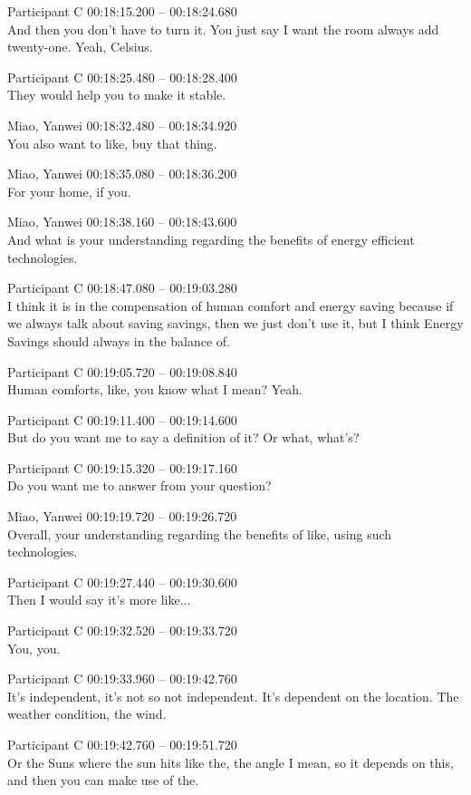 {Participant C 00:18:15.200 -- 00:18:24.680 \\
And then you don't have to turn it. You just say I want the room always add twenty-one. Yeah, Celsius.

Participant C 00:18:25.480 -- 00:18:28.400 \\
They would help you to make it stable.

Miao, Yanwei 00:18:32.480 -- 00:18:34.920 \\
You also want to like, buy that thing.

Miao, Yanwei 00:18:35.080 -- 00:18:36.200 \\
For your home, if you.

Miao, Yanwei 00:18:38.160 -- 00:18:43.600 \\
And what is your understanding regarding the benefits of energy efficient technologies.

Participant C 00:18:47.080 -- 00:19:03.280 \\
I think it is in the compensation of human comfort and energy saving because if we always talk about saving savings, then we just don't use it, but I think Energy Savings should always in the balance of.

Participant C 00:19:05.720 -- 00:19:08.840 \\
Human comforts, like, you know what I mean? Yeah.

Participant C 00:19:11.400 -- 00:19:14.600 \\
But do you want me to say a definition of it? Or what, what's?

Participant C 00:19:15.320 -- 00:19:17.160 \\
Do you want me to answer from your question?

Miao, Yanwei 00:19:19.720 -- 00:19:26.720 \\
Overall, your understanding regarding the benefits of like, using such technologies.

Participant C 00:19:27.440 -- 00:19:30.600 \\
Then I would say it's more like...

Participant C 00:19:32.520 -- 00:19:33.720 \\
You, you.

Participant C 00:19:33.960 -- 00:19:42.760 \\
It's independent, it's not so not independent. It's dependent on the location. The weather condition, the wind.

Participant C 00:19:42.760 -- 00:19:51.720 \\
Or the Suns where the sun hits like the, the angle I mean, so it depends on this, and then you can make use of the.

}

